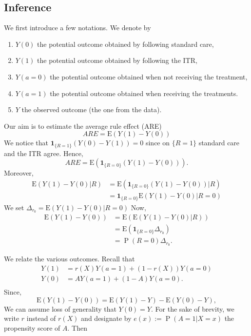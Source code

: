 \documentclass[10pt]{article}
\newcommand{\Esp}{\mbox{E}}
\newcommand{\ind}[1]{\bm{1}_{#1}}
\DeclareMathOperator{\Prob}{P}
\begin{document}
\subsection{Inference}

We first introduce a few notations. We denote by

\begin{enumerate}
\item $Y(0)$ the potential outcome obtained by following standard care,
\item $Y(1)$ the potential outcome obtained by following the ITR,
\item $Y(a=0)$ the potential outcome obtained when not receiving the treatment,
\item $Y(a=1)$ the potential outcome obtained when receiving the treatments.
\item $Y$ the observed outcome (the one from the data).
\end{enumerate}

Our aim is to estimate the average rule effect (ARE)
\begin{equation*}
	ARE=\Esp(Y(1)-Y(0))
\end{equation*}
We notice that $\ind{\lbrace R=1\rbrace}(Y(0)-Y(1))=0$ since on $\lbrace R=1\rbrace$ standard care and the ITR agree. Hence,
\begin{equation*}
	ARE=\Esp(\ind{\lbrace R=0 \rbrace}(Y(1)-Y(0))).
\end{equation*}
Moreover,
\begin{align*}
	\Esp(Y(1)-Y(0) | R)&=\Esp(\ind{\lbrace R=0 \rbrace}(Y(1)-Y(0))|R)\\
	&=\ind{\lbrace R=0 \rbrace} \Esp(Y(1)-Y(0)|R=0)
\end{align*}
We set $\Delta_{r_0}= \Esp(Y(1)-Y(0)|R=0)$
Now,
\begin{align*}
	\Esp(Y(1)-Y(0))&= \Esp (\Esp(Y(1)-Y(0)| R))\\
	&= \Esp(\ind{\lbrace R=0 \rbrace} \Delta_{r_0})\\
	&=\Prob(R=0)\Delta_{r_0}.
\end{align*}


We relate the various outcomes. Recall that
%
\begin{align*}
	Y(1)&=r(X) Y(a=1)+(1-r(X))Y(a=0)\\
	Y(0)&=A Y(a=1)+(1-A)Y(a=0).\\
\end{align*}
Since,
\begin{equation*}
	\Esp(Y(1)-Y(0))=\Esp(Y(1)-Y)-\Esp(Y(0)-Y),
\end{equation*}
We can assume loss of generality that $Y(0)=Y$. For the sake of brevity, we write $r$ instead of $r(X)$ and designate by $e(x):=\Prob(A=1|X=x)$ the propensity score of $A$. Then
\end{document}
